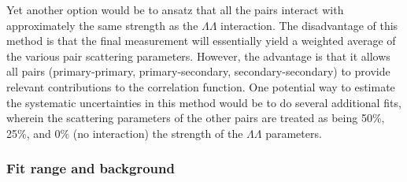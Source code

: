 Yet another option would be to ansatz that all the pairs interact with approximately the same strength as the $\Lambda\Lambda$ interaction.  
The disadvantage of this method is that the final measurement will essentially yield a weighted average of the various pair scattering parameters.  
However, the advantage is that it allows all pairs (primary-primary, primary-secondary, secondary-secondary) to provide relevant contributions to the correlation function.  
One potential way to estimate the systematic uncertainties in this method would be to do several additional fits, wherein the scattering parameters of the other pairs are treated as being 50\%, 25\%, and 0\% (no interaction) the strength of the $\Lambda\Lambda$ parameters.

\subsubsection{Fit range and background}
\label{sec:FitBackground}




